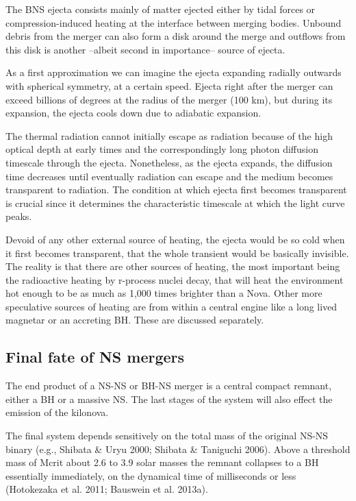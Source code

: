 The BNS ejecta consists mainly of matter ejected either by tidal forces or compression-induced heating at the interface between merging bodies. 
Unbound debris from the merger can also form a disk around the merge and outflows from this disk is another --albeit second in importance-- source of ejecta.

As a first approximation we can imagine the ejecta expanding radially outwards with spherical symmetry, at a certain speed.
Ejecta right after the merger can exceed billions of degrees at the radius of the merger (100 km), but 
during its expansion, the ejecta cools down due to adiabatic expansion.

The thermal radiation cannot initially escape as radiation because of the high optical depth at early times and the correspondingly long photon diffusion timescale through the ejecta. 
Nonetheless, as the ejecta expands, the diffusion time decreases until eventually radiation can escape and the medium becomes transparent to radiation.
The condition at which ejecta first becomes transparent is crucial since it determines the characteristic timescale at which the light curve peaks.

Devoid of any other external source of heating, the ejecta would be so cold when it first becomes transparent, that the whole transient would be basically invisible.
The reality is that there are other sources of heating, the most important being the radioactive heating by r-process nuclei decay, that will heat the environment hot enough to be as much as 1,000 times brighter than a Nova.
Other more speculative sources of heating are from within a central engine like a long lived magnetar or an accreting BH. These are discussed separately.


\subsection{Final fate of NS mergers}

The end product of a NS-NS or BH-NS merger is a central compact remnant, either a BH or a massive NS. 
The last stages of the system will also effect the emission of the kilonova.

The final system depends sensitively on the total mass of the original NS-NS binary (e.g., Shibata \& Uryu 2000; Shibata \& Taniguchi 2006). Above a threshold mass of Mcrit about 2.6 to 3.9 solar masses the remnant collapses to a BH essentially immediately, on the dynamical time of milliseconds or less (Hotokezaka et al. 2011; Bauswein et al. 2013a).

